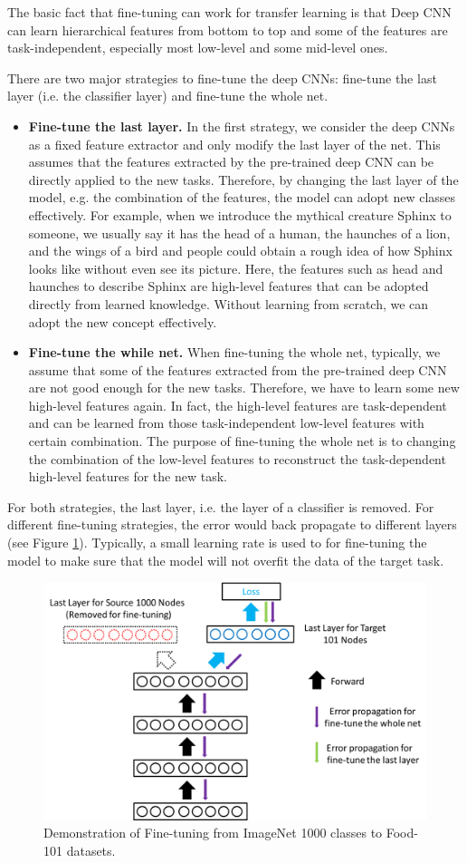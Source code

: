 The basic fact that fine-tuning can work for transfer learning is that Deep CNN can learn hierarchical features from bottom to top and some of the features are task-independent, especially most low-level and some mid-level ones.

There are two major strategies to fine-tune the deep CNNs: fine-tune the last layer (i.e. the classifier layer) and fine-tune the whole net.

\begin{itemize}
	\item \textbf{Fine-tune the last layer.} In the first strategy, we consider the deep CNNs as a fixed feature extractor and only modify the last layer of the net. This assumes that the features extracted by the pre-trained deep CNN can be directly applied to the new tasks. Therefore, by changing the last layer of the model, e.g. the combination of the features, the model can adopt new classes effectively. For example, when we introduce the mythical creature Sphinx to someone, we usually say it has the head of a human, the haunches of a lion, and the wings of a bird and people could obtain a rough idea of how Sphinx looks like without even see its picture. Here, the features such as head and haunches to describe Sphinx are high-level features that can be adopted directly from learned knowledge. Without learning from scratch, we can adopt the new concept effectively.
	\item \textbf{Fine-tune the while net.} When fine-tuning the whole net, typically, we assume that some of the features extracted from the pre-trained deep CNN are not good enough for the new tasks. Therefore, we have to learn some new high-level features again. In fact, the high-level features are task-dependent and can be learned from those task-independent low-level features with certain combination. The purpose of fine-tuning the whole net is to changing the combination of the low-level features to reconstruct the task-dependent high-level features for the new task. 
\end{itemize}

For both strategies, the last layer, i.e. the layer of a classifier is removed. For different fine-tuning strategies, the error would back propagate to different layers (see Figure \ref{fig:ft-net}). Typically, a small learning rate is used to for fine-tuning the model to make sure that the model will not overfit the data of the target task.

\begin{figure}
	\centering
	\includegraphics[scale=.5]{cnn/fig/ft.png}
	\caption{Demonstration of Fine-tuning from ImageNet 1000 classes to Food-101 datasets.}
	\label{fig:ft-net}
\end{figure}